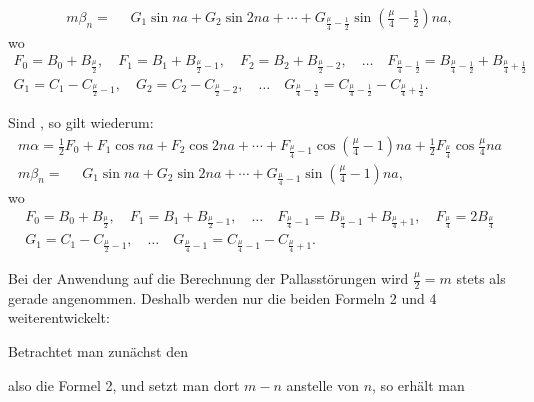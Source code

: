 \begin{landscape}
\[\begin{array}{l}
m\beta_n = \phantom{{}={}} G_1\sin na + G_2\sin 2na + \cdots + G_{\frac{\mu}{4}-\frac{1}{2}}\sin\left(\frac{\mu}{4}-\frac{1}{2}\right)na,
\end{array}
\]
wo
\[
\begin{gathered}
F_0 = B_0 + B_{\frac{\mu}{2}}, \quad F_1 = B_1 + B_{\frac{\mu}{2}-1}, \quad F_2 = B_2 + B_{\frac{\mu}{2}-2}, \quad \ldots \quad F_{\frac{\mu}{4}-\frac{1}{2}} = B_{\frac{\mu}{4}-\frac{1}{2}} + B_{\frac{\mu}{4}+\frac{1}{2}}\\[4pt]
G_1 = C_1 - C_{\frac{\mu}{2}-1}, \quad G_2 = C_2 - C_{\frac{\mu}{2}-2}, \quad \ldots \quad G_{\frac{\mu}{4}-\frac{1}{2}} = C_{\frac{\mu}{4}-\frac{1}{2}} - C_{\frac{\mu}{4}+\frac{1}{2}}.
\end{gathered}
\]
\par\noindent\hspace*{\parindent}Sind , so gilt wiederum:
\[
\tag*{4)}
\begin{array}{l}
m\alpha = \tfrac{1}{2}F_0 + F_1\cos na + F_2\cos 2na + \cdots + F_{\frac{\mu}{4}-1}\cos\left(\frac{\mu}{4}-1\right)na + \tfrac{1}{2}F_{\frac{\mu}{4}}\cos\frac{\mu}{4}na \\[4pt]
m\beta_n = \phantom{{}={}} G_1\sin na + G_2\sin 2na + \cdots + G_{\frac{\mu}{4}-1}\sin\left(\frac{\mu}{4}-1\right)na,
\end{array}
\]
wo
\[
\begin{gathered}
F_0 = B_0 + B_{\frac{\mu}{2}}, \quad F_1 = B_1 + B_{\frac{\mu}{2}-1}, \quad \ldots \quad F_{\frac{\mu}{4}-1} = B_{\frac{\mu}{4}-1} + B_{\frac{\mu}{4}+1}, \quad F_{\frac{\mu}{4}} = 2B_{\frac{\mu}{4}}\\[4pt]
G_1 = C_1 - C_{\frac{\mu}{2}-1}, \quad \ldots \quad G_{\frac{\mu}{4}-1} = C_{\frac{\mu}{4}-1} - C_{\frac{\mu}{4}+1}.
\end{gathered}
\]
\par\noindent\hspace*{\parindent}Bei der Anwendung auf die Berechnung der Pallasstörungen wird \(\frac{\mu}{2}=m\) stets als gerade angenommen. Deshalb werden nur die beiden Formeln 2 und 4 weiterentwickelt:
\par\noindent\hspace*{\parindent}Betrachtet man zunächst den
\par\nobreak\smallskip\noindent\hfill{}\hfill\mbox{}\par\nobreak\smallskip\noindent
also die Formel 2, und setzt man dort \(m-n\) anstelle von \(n\), so erhält man

\end{landscape}
